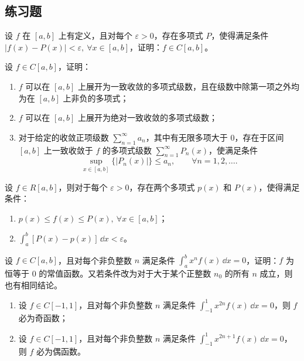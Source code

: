 \subsection{练习题}

\begin{xexercise}[1]
设 $f$ 在 $[a,b]$ 上有定义，且对每个 $\varepsilon>0$，存在多项式 $P$，使得满足条件 $|f(x)-P(x)|<\varepsilon,\ \forall x\in[a,b]$，证明：$f\in C[a,b]$。
\end{xexercise}

\begin{xexercise}[2]
设 $f\in C[a,b]$，证明：
\begin{enumerate}[label=(\arabic*)]
\item $f$ 可以在 $[a,b]$ 上展开为一致收敛的多项式级数，且在级数中除第一项之外均为在 $[a,b]$ 上非负的多项式；
\item $f$ 可以在 $[a,b]$ 上展开为绝对一致收敛的多项式级数；
\item 对于给定的收敛正项级数 $\sum_{n=1}^{\infty}a_n$，其中有无限多项大于 0，存在于区间 $[a,b]$ 上一致收敛于 $f$ 的多项式级数 $\sum_{n=1}^{\infty}P_n(x)$，使满足条件
\[
  \sup_{x\in[a,b]}\{|P_n(x)|\}\leqslant a_n,
  \qquad \forall n=1,2,\ldots.
\]
\end{enumerate}
\end{xexercise}

\begin{xexercise}[3]
设 $f\in R[a,b]$，则对于每个 $\varepsilon>0$，存在两个多项式 $p(x)$ 和 $P(x)$，使得满足条件：
\begin{enumerate}[label=(\arabic*)]
\item $p(x)\leqslant f(x)\leqslant P(x),\ \forall x\in[a,b]$；
\item $\displaystyle\int_a^b[P(x)-p(x)]\,\dd x<\varepsilon$。
\end{enumerate}
\end{xexercise}

\begin{xexercise}[4]
设 $f\in C[a,b]$，且对每个非负整数 $n$ 满足条件 $\int_a^b x^nf(x)\,\dd x=0$，证明：$f$ 为恒等于 0 的常值函数。又若条件改为对于大于某个正整数 $n_0$ 的所有 $n$ 成立，则也有相同结论。
\end{xexercise}

\begin{xexercise}[5]
\begin{enumerate}[label=(\arabic*)]
\item 设 $f\in C[-1,1]$，且对每个非负整数 $n$ 满足条件 $\int_{-1}^1x^{2n}f(x)\,\dd x=0$，则 $f$ 必为奇函数；
\item 设 $f\in C[-1,1]$，且对每个非负整数 $n$ 满足条件 $\int_{-1}^1x^{2n+1}f(x)\,\dd x=0$，则 $f$ 必为偶函数。
\end{enumerate}
\end{xexercise}

